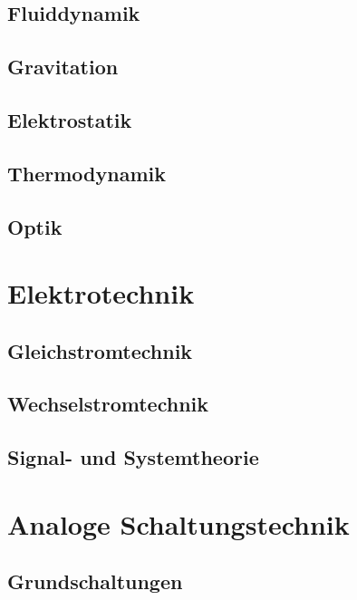 \documentclass[a5paper]{report}
\begin{document}
		\chapter{Fluiddynamik}
		

		\chapter{Gravitation}
		

		\chapter{Elektrostatik}
		

		\chapter{Thermodynamik}
		

		\chapter{Optik}
		

	\part{Elektrotechnik}

		\chapter{Gleichstromtechnik}
		

		\chapter{Wechselstromtechnik}
		

		\chapter{Signal- und Systemtheorie}
		
		
	\part{Analoge Schaltungstechnik}
	
		\chapter{Grundschaltungen}
		
		
\end{document}
